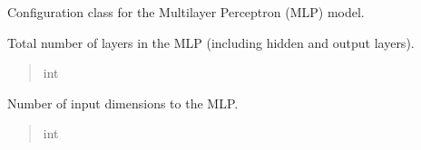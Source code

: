 \documentclass[letterpaper,10pt,english]{sphinxmanual}
\begin{document}
\begin{fulllineitems}
\label{\detokenize{index:hypyml.configs.MLPConfig}}
\pysigstartsignatures
{}
\pysigstopsignatures
\sphinxAtStartPar
Configuration class for the Multilayer Perceptron (MLP) model.

\begin{fulllineitems}
\label{\detokenize{index:hypyml.configs.MLPConfig.layers}}
\pysigstartsignatures
{}
\pysigstopsignatures
\sphinxAtStartPar
Total number of layers in the MLP (including hidden and output layers).
\begin{quote}\begin{description}
\sphinxAtStartPar
int

\end{description}\end{quote}

\end{fulllineitems}


\begin{fulllineitems}
\label{\detokenize{index:hypyml.configs.MLPConfig.num_input_dim}}
\pysigstartsignatures
{}
\pysigstopsignatures
\sphinxAtStartPar
Number of input dimensions to the MLP.
\begin{quote}\begin{description}
\sphinxAtStartPar
int

\end{description}\end{quote}


\end{fulllineitems}
\end{fulllineitems}
\end{document}
